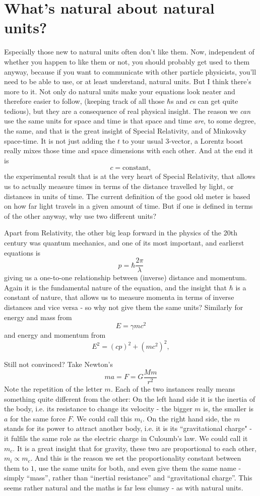 \section{What's natural about natural units?}
\label{sec:NaturalUnitsAppendix}

Especially those new to natural units often don't like them. Now, independent of
whether you happen to like them or not, you should probably get used to them
anyway, because if you want to communicate with other particle physicists,
you'll need to be able to use, or at least understand, natural units.  But I
think there's more to it.  Not only do natural units make your equations look
neater and therefore easier to follow, (keeping track of all those $\hbar$s
and $c$s can get quite tedious), but they are a consequence of real physical
insight. The reason we \emph{can} use the same units for space and time is
that space and time \emph{are}, to some degree, the same, and that is the
great insight of Special Relativity, and of Minkovsky space-time. It is not
just adding the $t$ to your usual 3-vector, a Lorentz boost really mixes those
time and space dimensions with each other.  And at the end it is
\[
c=\mathrm{constant},
\]
the experimental result that is at the very heart of Special Relativity, that
allows us to actually measure times in terms of the distance travelled by
light, or distances in units of time. The current definition of the good old
meter is based on how far light travels in a given amount of time. But if one
is defined in terms of the other anyway, why use two different units?

Apart from Relativity, the other big leap forward in the physics of the 20th
century was quantum mechanics, and one of its most important, and earlierst
equations is
\[
   p = \hbar \frac{2\pi}{\lambda}
\]
giving us a one-to-one relationship  between (inverse) distance and
momentum. Again it is the fundamental nature of the equation, and the
insight that $\hbar$ is a constant of nature, that allows us to measure
momenta in terms of inverse distances and vice versa - so why not give them
the same units? Similarly for energy and mass from
\[
 E = \gamma m c^2
\]
and energy and momentum from
\[
  E^2 = (cp)^2 + (mc^2)^2,
\]

Still not convinced? Take Newton's
\[
   ma = F = G \frac{Mm}{r^2}
\]
Note the repetition of the letter $m$. Each of the two instances
really means something quite different from the other: On the left
hand side it is the inertia of the body, i.e. its resistance to change
its velocity - the bigger $m$ is, the smaller is $a$ for the same
force $F$. We could call this $m_i$. On the right hand side, the $m$
stands for its power to attract another body, i.e. it is its
``gravitational charge" - it fulfils the same role as the electric
charge in Culoumb's law. We could call it $m_c$. It is
a great insight that for gravity, these two are proportional to each
other, $m_i \propto m_c$. And this is the reason we set the
proportionality constant between them to $1$, use the same units for
both, and even give them the same name - simply ``mass'', rather than
``inertial resistance'' and ``gravitational charge''. This seems
rather natural and the maths is far less clumsy - as with natural
units.

